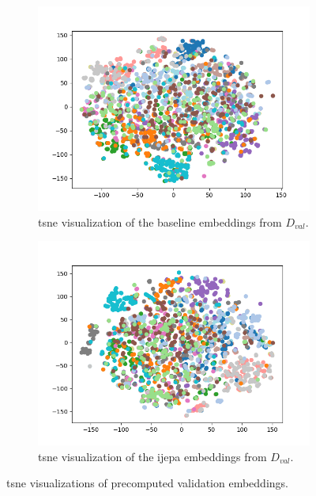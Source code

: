 \begin{figure}[ht!]
	\begin{subfigure}[t]{.4\linewidth}
		\centering
		\includegraphics[width=1\linewidth]{images/2d_base_val_scatter.png} 
		\caption{\gls{tsne} visualization of the baseline embeddings from $D_{val}$.}
	\end{subfigure}
	\hfill
	\begin{subfigure}[t]{.4\linewidth}
		\centering
		\includegraphics[width=1\linewidth]{images/2d_val_scatter.png} 
		\caption{\gls{tsne} visualization of the \gls{ijepa} embeddings from $D_{val}$.}
	\end{subfigure}
	\caption{\gls{tsne} visualizations of precomputed validation embeddings.}
\end{figure}
\label{fig:tsne_embeddings}

